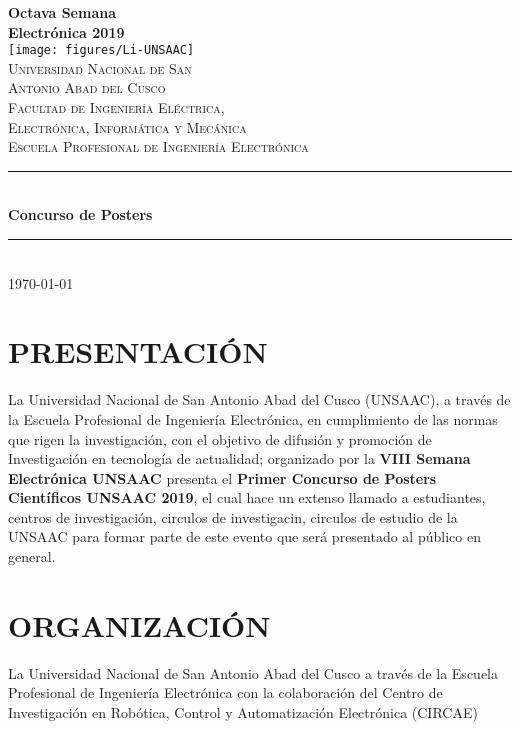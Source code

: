 \documentclass{article}
\newcommand\BackgroundPic{%
\put(0,0){%
\parbox[b][\paperheight]{\paperwidth}{%
\vfill
\centering
\texttt{[image: figures/back]}%
\vfill
}}}
\begin{document}
\AddToShipoutPicture*{\BackgroundPic}
\begin{titlepage}
\newcommand{\HRule}{\rule{\linewidth}{0.5mm}} 
\center
{\Huge \bfseries Octava Semana \\ Electrónica 2019} \\[1cm]
\texttt{[image: figures/Li-UNSAAC]}\\[1cm]
\textsc{\LARGE  Universidad Nacional de San \\[0.2cm] Antonio Abad del Cusco}\\[0.4cm] 
\textsc{\Large Facultad de Ingeniería Eléctrica, \\ Electrónica, Informática y Mecánica}\\[0.4cm] 
\textsc{\large Escuela Profesional de Ingeniería Electrónica}\\[0.4cm]
\HRule \\[0.4cm]
{ \huge \bfseries Concurso de Posters}\\[0.3cm] 
\HRule \\[1.5cm]
\today
\end{titlepage}



\newpage
\noindent
\normalfont

\section{PRESENTACIÓN}
\normalfont

La Universidad Nacional de San Antonio Abad del Cusco (UNSAAC), a través de la Escuela Profesional de Ingeniería Electrónica, en cumplimiento de las normas que rigen la investigación, con el objetivo de difusión y promoción de Investigación en tecnología de actualidad; organizado por la \textbf{VIII Semana Electrónica UNSAAC} presenta el \textbf{Primer Concurso de Posters Científicos UNSAAC 2019}, el cual hace un extenso llamado a estudiantes, centros de investigación, circulos de investigacin, circulos de estudio de la UNSAAC para formar parte de este evento que será presentado al público en general.

\section{ORGANIZACIÓN}

La Universidad Nacional de San Antonio Abad del Cusco a través de la Escuela Profesional de Ingeniería Electrónica con la colaboración del Centro de Investigación en Robótica, Control y Automatización Electrónica (CIRCAE)
\end{document}
